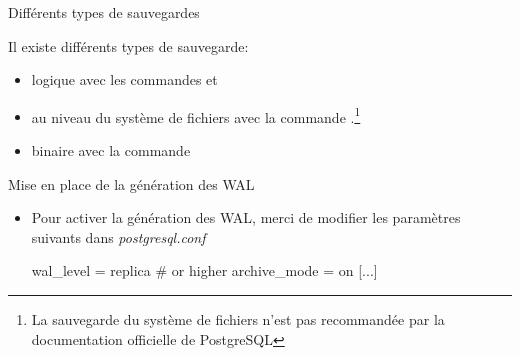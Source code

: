 
\begin{frame}[fragile]{Différents types de sauvegardes}

Il existe différents types de sauvegarde:

\begin{itemize}

   \item logique avec les commandes  et 
   \item au niveau du système de fichiers avec la commande .\footnote{La sauvegarde du système de fichiers n'est pas recommandée par la documentation officielle de PostgreSQL}
   \item binaire avec la commande 

\end{itemize}

\begin{toile}
\end{toile}

\end{frame}


\begin{frame}[fragile]{Mise en place de la génération des WAL}

\begin{itemize}

   \item Pour activer la génération des WAL, merci de modifier les paramètres suivants dans \textit{postgresql.conf}

\begin{intercom}
wal\_level = replica # or higher
archive\_mode = on
[...]
\end{intercom}

\end{itemize}

\begin{toile}
\end{toile}

\end{frame}



